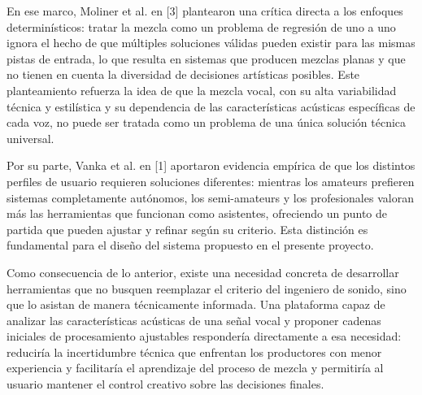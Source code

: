 En ese marco, Moliner et al. en [3] plantearon una crítica directa a los enfoques determinísticos: tratar la mezcla como un problema de regresión de uno a uno ignora el hecho de que múltiples soluciones válidas pueden existir para las mismas pistas de entrada, lo que resulta en sistemas que producen mezclas planas y que no tienen en cuenta la diversidad de decisiones artísticas posibles. Este planteamiento refuerza la idea de que la mezcla vocal, con su alta variabilidad técnica y estilística y su dependencia de las características acústicas específicas de cada voz, no puede ser tratada como un problema de una única solución técnica universal.

Por su parte, Vanka et al. en [1] aportaron evidencia empírica de que los distintos perfiles de usuario requieren soluciones diferentes: mientras los amateurs prefieren sistemas completamente autónomos, los semi-amateurs y los profesionales valoran más las herramientas que funcionan como asistentes, ofreciendo un punto de partida que pueden ajustar y refinar según su criterio. Esta distinción es fundamental para el diseño del sistema propuesto en el presente proyecto.

Como consecuencia de lo anterior, existe una necesidad concreta de desarrollar herramientas que no busquen reemplazar el criterio del ingeniero de sonido, sino que lo asistan de manera técnicamente informada. Una plataforma capaz de analizar las características acústicas de una señal vocal y proponer cadenas iniciales de procesamiento ajustables respondería directamente a esa necesidad: reduciría la incertidumbre técnica que enfrentan los productores con menor experiencia y facilitaría el aprendizaje del proceso de mezcla y permitiría al usuario mantener el control creativo sobre las decisiones finales.
